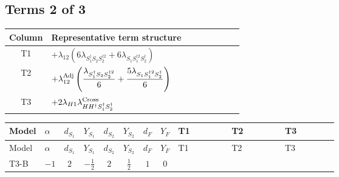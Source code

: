 \documentclass[8pt]{article}
\begin{document}
\begin{landscape}
\subsection*{Terms 2 of 3}
\begin{center}
\begin{tabular}{@{}c >{\raggedright\arraybackslash}p{0.82\linewidth}@{}}
\toprule
Column & Representative term structure \\
\midrule
T1 & \(\displaystyle +{\lambda_{12}} (6 {\lambda_{S_1^\dagger S_2 S_2^{\dagger 2}}}+6 {\lambda_{S_1 S_1^{\dagger 2}S_2^\dagger}})\) \\
\midrule
T2 & \(\displaystyle +{\lambda_{12}^{\rm Adj}} \left(\frac{{\lambda_{S_1^\dagger S_2 S_2^{\dagger 2}}}}{6}+\frac{5 {\lambda_{S_1 S_1^{\dagger 2}S_2^\dagger}}}{6}\right)\) \\
\midrule
T3 & \(\displaystyle +2 {\lambda_{H1}} {\lambda_{H H^\dagger S_1^\dagger S_2^\dagger}^{\rm Cross}}\) \\
\midrule
\bottomrule
\end{tabular}
\end{center}
\smallskip
\tiny
\begin{longtable}{@{}llcccccc >{\raggedright\arraybackslash}p{0.21\linewidth} >{\raggedright\arraybackslash}p{0.21\linewidth} >{\raggedright\arraybackslash}p{0.21\linewidth}@{}}
\toprule
Model & $\alpha$ & $d_{S_1}$ & $Y_{S_1}$ & $d_{S_2}$ & $Y_{S_2}$ & $d_F$ & $Y_F$ & T1 & T2 & T3 \\
\midrule
\endfirsthead
\toprule
Model & $\alpha$ & $d_{S_1}$ & $Y_{S_1}$ & $d_{S_2}$ & $Y_{S_2}$ & $d_F$ & $Y_F$ & T1 & T2 & T3 \\
\midrule
\endhead
T3-B & $-1$ & $2$ & $-\frac{1}{2}$ & $2$ & $\frac{1}{2}$ & $1$ & $0$ & \scriptsize\adjustbox{max width=\linewidth}{$\begin{gathered} +{\lambda_{12}} (6 {\lambda_{S_1^\dagger S_2 S_2^{\dagger 2}}}+6 {\lambda_{S_1 S_1^{\dagger 2}S_2^\dagger}})\end{gathered}$} & \scriptsize\adjustbox{max width=\linewidth}{$\begin{gathered} +{\lambda_{12}^{\rm Adj}} \left(\frac{{\lambda_{S_1^\dagger S_2 S_2^{\dagger 2}}}}{6}+\frac{5 {\lambda_{S_1 S_1^{\dagger 2}S_2^\dagger}}}{6}\right)\end{gathered}$} & \scriptsize\adjustbox{max width=\linewidth}{$\begin{gathered} +2 {\lambda_{H1}} {\lambda_{H H^\dagger S_1^\dagger S_2^\dagger}^{\rm Cross}}\end{gathered}$} \\

\end{longtable}
\end{landscape}
\end{document}
